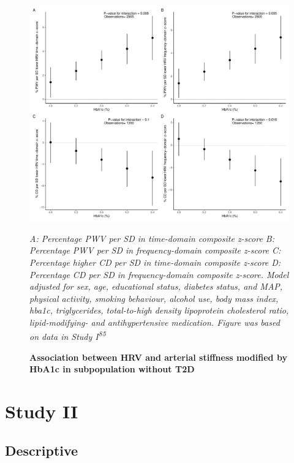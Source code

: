 \documentclass[
  a4paper,
  headsepline=true,
  open=left]{scrbook}
\begin{document}
\begin{figure}

{\centering 

\includegraphics{images/em_hba1c.pdf}

\emph{A: Percentage PWV per SD in time-domain composite z-score B:
Percentage PWV per SD in frequency-domain composite z-score C:
Percentage higher CD per SD in time-domain composite z-score D:
Percentage CD per SD in frequency-domain composite z-score. Model
adjusted for sex, age, educational status, diabetes status, and MAP,
physical activity, smoking behaviour, alcohol use, body mass index,
hba1c, triglycerides, total-to-high density lipoprotein cholesterol
ratio, lipid-modifying- and antihypertensive medication. Figure was
based on data in Study I\textsuperscript{85}}

}

\caption{\label{fig-MS-HRV_dys}\textbf{Association between HRV and
arterial stiffness modified by HbA1c in subpopulation without T2D}}

\end{figure}

\restoregeometry

\hypertarget{study-ii}{%
\section{Study II}\label{study-ii}}

\hypertarget{descriptive-1}{%
\subsection{Descriptive}\label{descriptive-1}}
\end{document}
